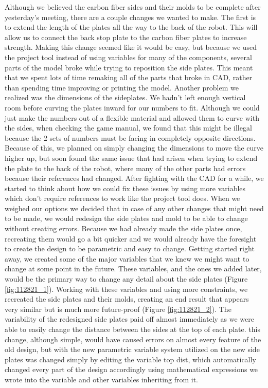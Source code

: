Although we believed the carbon fiber sides and their molds to be complete after yesterday’s meeting, there are a couple changes we wanted to make. The first is to extend the length of the plates all the way to the back of the robot. This will allow us to connect the back stop plate to the carbon fiber plates to increase strength. Making this change seemed like it would be easy, but because we used the project tool instead of using variables for many of the components, several parts of the model broke while trying to reposition the side plates. This meant that we spent lots of time remaking all of the parts that broke in CAD, rather than spending time improving or printing the model. Another problem we realized was the dimensions of the sideplates. We hadn’t left enough vertical room before curving the plates inward for our numbers to fit. Although we could just make the numbers out of a flexible material and allowed them to curve with the sides, when checking the game manual, we found that this might be illegal because the 2 sets of numbers must be facing in completely opposite directions. Because of this, we planned on simply changing the dimensions to move the curve higher up, but soon found the same issue that had arisen when trying to extend the plate to the back of the robot, where many of the other parts had errors because their references had changed. After fighting with the CAD for a while, we started to think about how we could fix these issues by using more variables which don’t require references to work like the project tool does. When we weighed our options we decided that in case of any other changes that might need to be made, we would redesign the side plates and mold to be able to change without creating errors. Because we had already made the side plates once, recreating them would go a bit quicker and we would already have the foresight to create the design to be parametric and easy to change.
Getting started right away, we created some of the major variables that we knew we might want to change at some point in the future. These variables, and the ones we added later, would be the primary way to change any detail about the side plates (Figure \ref{fig:112821_1}). Working with these variables and using more constraints, we recreated the side plates and their molds, creating an end result that appears very similar but is much more future-proof (Figure \ref{fig:112821_2}). The variability of the redesigned side plates paid off almost immediately as we were able to easily change the distance between the sides at the top of each plate. this change, although simple, would have caused errors on almost every feature of the old design, but with the new parametric variable system utilized on the new side plates was changed simply by editing the variable top dist, which automatically changed every part of the design accordingly using mathematical expressions we wrote into the variable and other variables inheriting from it.

